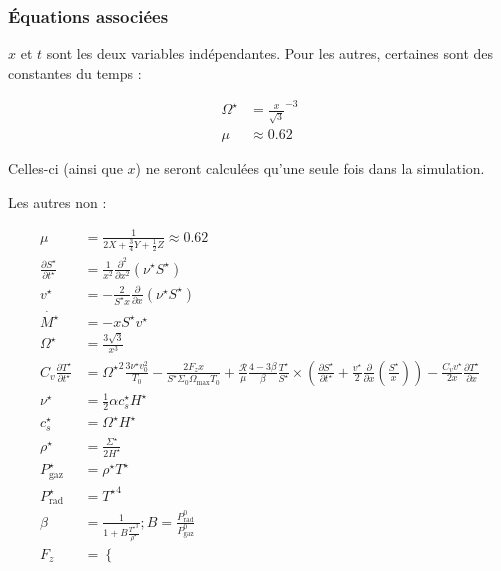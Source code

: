 \subsubsection{Équations associées}

$x$ et $t$ sont les deux variables indépendantes. Pour les autres, certaines sont des constantes du temps :

\begin{align}
    \Omega^\star &= \frac{x}{\sqrt{3}}^{-3} \\ 
    \mu &\approx 0.62
\end{align}

Celles-ci (ainsi que $x$) ne seront calculées qu’une seule fois dans la simulation.

Les autres non :

\begin{align}
    \mu &= \frac{1}{2 X + \frac{3}{4} Y + \frac{1}{2} Z} \approx 0.62 \\
    \frac{\partial S^\star}{\partial t^\star} &= \frac{1}{x^2} \frac{\partial^2}{\partial x^2} \left(\nu^\star S^\star\right) \\
    v^\star &= - \frac{2}{S^\star x} \frac{\partial}{\partial x} \left(\nu^\star S^\star\right) \\
    \dot{M^\star} &= - x S^\star v^\star \\
    \Omega^\star &= \frac{3\sqrt{3}}{x^3} \\
    C_v \frac{\partial T^{\star}}{\partial t^{\star}} &=
    {\Omega^\star}^2 \frac{3 \nu^\star v_0^2}{T_0} -
    \frac{2 F_z x}{S^\star \Sigma_0 \Omega_\mathrm{max} T_0} +
    \frac{\mathcal{R}}{\mu} \frac{4-3\beta}{\beta} \frac{T^\star}{S^\star} \times
    \left( \frac{\partial S^\star}{\partial t^\star} + \frac{v^\star}{2} \frac{\partial}{\partial x} \left(\frac{S^\star}{x}\right) \right) -
    \frac{C_v v^\star}{2 x} \frac{\partial T^\star}{\partial x} \\
    \nu^\star &= \frac{1}{2} \alpha c_s^\star H^\star \\
    c_s^\star &= \Omega^\star H^\star \\
    \rho^\star &= \frac{\Sigma^\star}{2 H^\star} \\
    P_\mathrm{gaz}^\star &= \rho^\star T^\star \\
    P_\mathrm{rad}^\star &= {T^\star}^4 \\
    \beta &= \frac{1}{1 + B \frac{{T^\star}^3}{\rho^\star}} ; B = \frac{P_\mathrm{rad}^0}{P_\mathrm{gaz}^0} \\
    F_z &=
    \begin{cases}

\end{cases}
\end{align}
